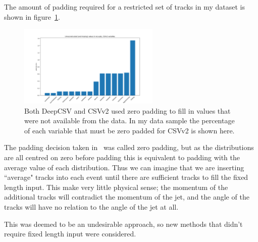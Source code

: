 The amount of padding required for a restricted set of tracks in my dataset is shown in figure~\ref{fig:prog_unreconstructed}.
\begin{figure}
    \centering
    \includegraphics[width=0.6\textwidth]{images/prog_unreconstructed.png}
    \caption{Both DeepCSV and CSVv2 used zero padding to fill in values that were not available from the data. In my data sample the percentage of each variable that must be zero padded for CSVv2 is shown here.}
    \label{fig:prog_unreconstructed}
\end{figure}

The padding decision taken in~\cite{CMS_CSVDeepCSV13TeV} was called zero padding, 
but as the distributions are all centred on zero before padding this is equivalent to padding with the average value of each distribution.
Thus we can imagine that we are inserting ``average" tracks into each event until there are sufficient tracks to fill the fixed length input.
This make very little physical sense; the momentum of the additional tracks will contradict the momentum of the jet, and the angle of the tracks
will have no relation to the angle of the jet at all.

This was deemed to be an undesirable approach, so new methods that didn't require fixed length input were considered.

